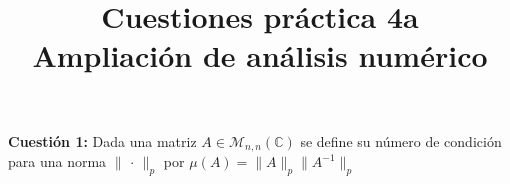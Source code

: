 \documentclass[12pt]{article}
\title{\textbf{Cuestiones práctica 4a\\ {\small Ampliación de análisis numérico}}}
\date{}
\author{}
\newcommand{\CC}{\mathds{C}}
\newcommand{\norm}[1]{\lVert #1\rVert}
\theoremstyle{definition}
\begin{document}
	\maketitle
	\noindent
	\textbf{Cuestión 1:} Dada una matriz $A\in\mathcal{M}_{n,n}(\CC)$ se define su número de condición para una norma $\norm{\,\cdot\,}_p$ por $\mu(A) = \norm{A}_p \norm{A^{-1}}_p$
\end{document}
